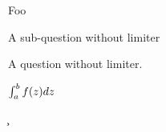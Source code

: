 \documentclass{article}
\begin{document}
\question

\subquestion

Foo

\subquestionnobar

A sub-question without limiter


\questionnobar

A question without limiter.





$\int\displaylimits_{a}^{b}f(z)dz$


\dpi

\c{}


\ux

\ex

 \w
\end{document}
